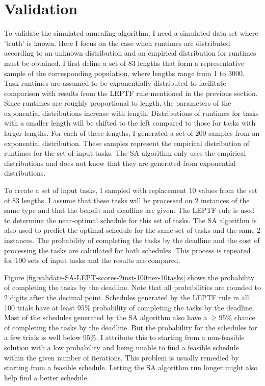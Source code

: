 \documentclass[12pt]{report}
\begin{document}
\section{Validation}

To validate the simulated annealing algorithm, I need a simulated data set where 'truth' is known.
Here I focus on the case when runtimes are distributed according to an unknown distribution and an empirical distribution for runtimes must be obtained.
I first define a set of 83 lengths that form a representative sample of the corresponding population, where lengths range from 1 to 3000.
Task runtimes are assumed to be exponentially distributed to facilitate comparison with results from the LEPTF rule mentioned in the previous section.
Since runtimes are roughly proportional to length, the parameters of the exponential distributions increase with length.
Distributions of runtimes for tasks with a smaller length will be shifted to the left compared to those for tasks with larger lengths.
For each of these lengths, I generated a set of 200 samples from an exponential distribution.
These samples represent the empirical distribution of runtimes for the set of input tasks. 
The SA algorithm only uses the empirical distributions and does not know that they are generated from exponential distributions.

To create a set of input tasks, I sampled with replacement 10 values from the set of 83 lengths.
I assume that these tasks will be processed on 2 instances of the same type and that the benefit and deadline are given.
The LEPTF rule is used to determine the near-optimal schedule for this set of tasks.
The SA algorithm is also used to predict the optimal schedule for the same set of tasks and the same 2 instances.
The probability of completing the tasks by the deadline and the cost of processing the tasks are calculated for both schedules.
This process is repeated for 100 sets of input tasks and the results are compared.

Figure \ref{fig:validate-SA-LEPT-scores-2inst-100iter-10tasks} shows the probability of completing the tasks by the deadline.
Note that all probabilities are rounded to 2 digits after the decimal point.
Schedules generated by the LEPTF rule in all 100 trials have at least 95\% probability of completing the tasks by the deadline.
Most of the schedules generated by the SA algorithm also have a $\geq 95\%$ chance of completing the tasks by the deadline.
But the probability for the schedules for a few trials is well below 95\%.
I attribute this to starting from a non-feasible solution with a low probability and being unable to find a feasible schedule within the given number of iterations.
This problem is usually remedied by starting from a feasible schedule.
Letting the SA algorithm run longer might also help find a better schedule.
\end{document}
